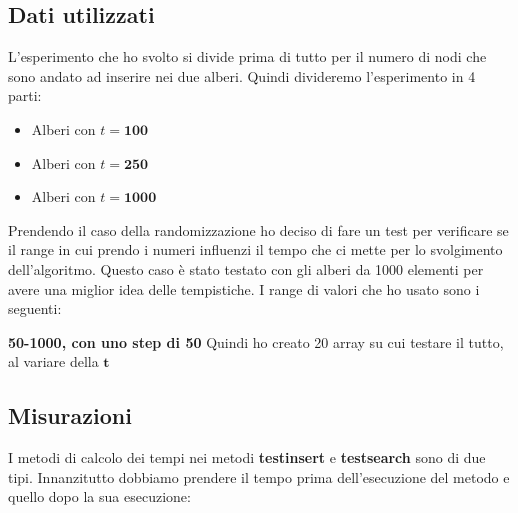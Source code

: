 \subsection{Dati utilizzati}
\label{sec:DatiUtilizzati_1}
L'esperimento che ho svolto si divide prima di tutto per il numero di nodi che sono andato ad inserire nei due alberi. Quindi divideremo l'esperimento in 4 parti:

\begin{itemize}
    \item Alberi con $t=\textbf{100}$
    \item Alberi con $t=\textbf{250}$
    \item Alberi con $t=\textbf{1000}$
\end{itemize}

Prendendo il caso della randomizzazione ho deciso di fare un test per verificare se il range in cui prendo i numeri influenzi il tempo che ci mette per lo svolgimento dell'algoritmo. Questo caso è stato testato con gli alberi da 1000 elementi per avere una miglior idea delle tempistiche. I range di valori che ho usato sono i seguenti:

\textbf{50-1000, con uno step di 50}
Quindi ho creato 20 array su cui testare il tutto, al variare della $\textbf{t}$

\subsection{Misurazioni}
\label{sec:Misurazioni_1}
I metodi di calcolo dei tempi nei metodi \textbf{test\textunderscore insert} e \textbf{test\textunderscore search} sono di due tipi. Innanzitutto dobbiamo prendere il tempo prima dell'esecuzione del metodo e quello dopo la sua esecuzione:


